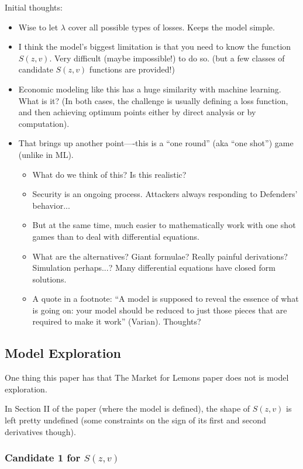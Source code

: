 \documentclass[11pt]{article}
\begin{document}
Initial thoughts:
\begin{itemize}
    \item Wise to let $\lambda$ cover all possible types of losses. Keeps the model simple. 
    \item I think the model's biggest limitation is that  you need to know the function $S(z,v)$. Very difficult (maybe impossible!) to do so. (but a few classes of candidate $S(z,v)$ functions are provided!)
    \item Economic modeling like this has a huge similarity with machine learning. What is it? (In both cases, the challenge is usually defining a loss function, and then achieving optimum points either by direct analysis or by computation).
    \item That brings up another point----this is a ``one round'' (aka ``one shot'') game (unlike in ML). 
    \begin{itemize}
        \item What do we think of this? Is this realistic?
        \item Security is an ongoing process. Attackers always responding to Defenders' behavior...
        \item But at the same time, much easier to mathematically work with one shot games than to deal with differential equations.
        \item What are the alternatives? Giant formulae? Really painful derivations? Simulation perhaps...? Many differential equations have closed form solutions.
        \item A quote in a footnote: ``A model is supposed to reveal the essence of what is going on: your model should be reduced to just those pieces that are required to make it work'' (Varian). Thoughts?
    \end{itemize}
\end{itemize}

\subsection{Model Exploration}

One thing this paper has that The Market for Lemons paper does not is model exploration. 

In Section II of the paper (where the model is defined), the shape of $S(z,v)$ is left pretty undefined (some constraints on the sign of its first and second derivatives though).

\subsubsection{Candidate 1 for $S(z,v)$}
\end{document}
